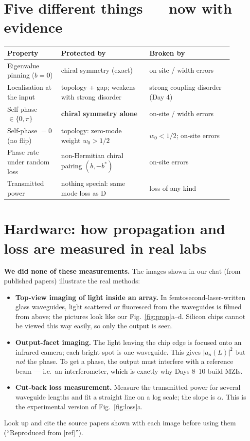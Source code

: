 \documentclass[10pt,a4paper]{article}
\begin{document}
\section{Five different things --- now with evidence}
\begin{tabular}{@{}p{0.22\linewidth}p{0.36\linewidth}p{0.34\linewidth}@{}}\toprule
Property & Protected by & Broken by\\\midrule
Eigenvalue pinning ($b=0$) & chiral symmetry (exact) & on-site / width errors\\
Localisation at the input & topology + gap; weakens with strong disorder & strong coupling disorder (Day 4)\\
Self-phase $\in\{0,\pi\}$ & \textbf{chiral symmetry alone} & on-site / width errors\\
Self-phase $=0$ (no flip) & topology: zero-mode weight $w_0>1/2$ & $w_0<1/2$; on-site errors\\
Phase rate under random loss & non-Hermitian chiral pairing $(b,-b^*)$ & on-site errors\\
Transmitted power & nothing special: same mode loss as D & loss of any kind\\\bottomrule
\end{tabular}

\section{Hardware: how propagation and loss are measured in real labs}
\textbf{We did none of these measurements.} The images shown in our chat (from published papers) illustrate the real methods:
\begin{itemize}[itemsep=1pt]
\item \textbf{Top-view imaging of light inside an array.} In femtosecond-laser-written glass waveguides, light scattered or fluoresced from the waveguides is filmed from above; the pictures look like our Fig.~\ref{fig:prop}a--d. Silicon chips cannot be viewed this way easily, so only the output is seen.
\item \textbf{Output-facet imaging.} The light leaving the chip edge is focused onto an infrared camera; each bright spot is one waveguide. This gives $|a_n(L)|^2$ but \emph{not} the phase. To get a phase, the output must interfere with a reference beam --- i.e.\ an interferometer, which is exactly why Days 8--10 build MZIs.
\item \textbf{Cut-back loss measurement.} Measure the transmitted power for several waveguide lengths and fit a straight line on a log scale; the slope is $\alpha$. This is the experimental version of Fig.~\ref{fig:loss}a.
\end{itemize}
Look up and cite the source papers shown with each image before using them (``Reproduced from [ref]'').
\end{document}

